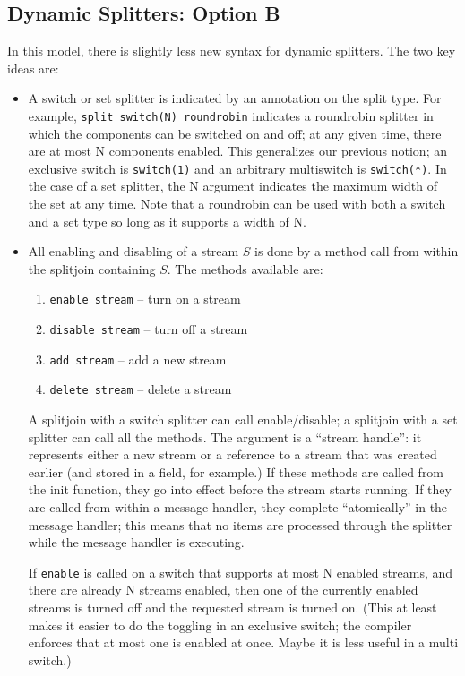 \documentclass{tr}
\begin{document}

\subsection{Dynamic Splitters:  Option B}

In this model, there is slightly less new syntax for dynamic
splitters.  The two key ideas are:

\begin{itemize}

\item A switch or set splitter is indicated by an annotation on the
split type. For example, \verb+split switch(N) roundrobin+ indicates a
roundrobin splitter in which the components can be switched on and
off; at any given time, there are at most N components enabled.  This
generalizes our previous notion; an exclusive switch is
\verb+switch(1)+ and an arbitrary multiswitch is \verb+switch(*)+.  In
the case of a set splitter, the N argument indicates the maximum width
of the set at any time.  Note that a roundrobin can be used with both
a switch and a set type so long as it supports a width of N.

\item All enabling and disabling of a stream $S$ is done by a method
call from within the splitjoin containing $S$.  The methods available
are:

\begin{enumerate}

\item \verb+enable stream+ -- turn on a stream
\item \verb+disable stream+ -- turn off a stream
\item \verb+add stream+ -- add a new stream
\item \verb+delete stream+ -- delete a stream

\end{enumerate}

A splitjoin with a switch splitter can call enable/disable; a
splitjoin with a set splitter can call all the methods.  The argument
is a ``stream handle'': it represents either a new stream or a
reference to a stream that was created earlier (and stored in a field,
for example.)  If these methods are called from the init function,
they go into effect before the stream starts running.  If they are
called from within a message handler, they complete ``atomically'' in
the message handler; this means that no items are processed through the
splitter while the message handler is executing.

If \verb+enable+ is called on a switch that supports at most N enabled
streams, and there are already N streams enabled, then one of the
currently enabled streams is turned off and the requested stream is
turned on.  (This at least makes it easier to do the toggling in an
exclusive switch; the compiler enforces that at most one is enabled at
once.  Maybe it is less useful in a multi switch.)

\end{itemize}
\end{document}
